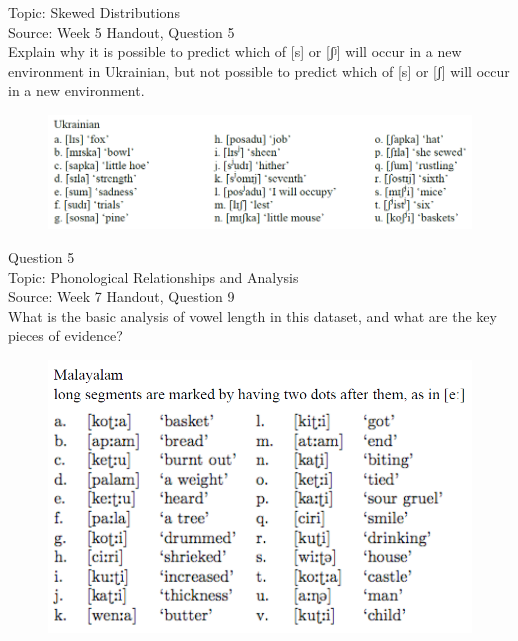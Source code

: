 \documentclass[12pt]{article}
\begin{document}
Topic: Skewed Distributions\\
Source: Week 5 Handout, Question 5\\

Explain why it is possible to predict which of [s] or [ʃʲ] will occur in a new environment in Ukrainian, but not possible to predict which of [s] or [ʃ] will occur in a new environment.\\

\begin{figure}[H]
\includegraphics{../images/ukrainian.png}
\end{figure}

\newpage

{\large Question 5}\\

Topic: Phonological Relationships and Analysis\\
Source: Week 7 Handout, Question 9\\

What is the basic analysis of vowel length in this dataset, and what are the key pieces of evidence?\\

\begin{figure}[H]
\includegraphics{../images/malayalam.png}
\end{figure}

\newpage
\end{document}
